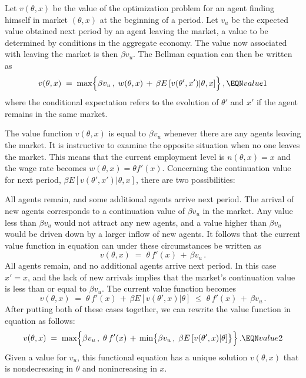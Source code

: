 Let $v(\theta, x)$ be the value of the optimization problem
for an agent finding himself in market $(\theta, x)$ at the
beginning of a period. Let $v_u$ be the expected value obtained
next period by an agent leaving the market, a value to be
determined by conditions in the aggregate economy.
The value now associated with leaving the
market is then $\beta v_u$.
 The Bellman equation can then be
written as %
$$v(\theta, x) \;=\; \max \Bigl\{\beta v_u \,,\; w(\theta, x) \,+\,
   \beta E\left[v(\theta',x') \vert \theta, x \right]
                                                     \Bigr\}\,, \EQN value1
$$
where the conditional expectation refers to the evolution of
$\theta'$ and $x'$ if the agent remains in the same market.


The value function $v(\theta, x)$ is equal to $\beta v_u$ whenever
there are any agents leaving the market. It is instructive to
examine the opposite situation when no one leaves the market.
This means that the current employment level is
$n(\theta, x) = x$ and the wage rate becomes
$w(\theta, x) = \theta f'(x)$. Concerning the continuation
value for next period,
$\beta E\left[v(\theta',x') \vert \theta, x \right]$, there
are two possibilities:

\medskip
{} All agents remain, and some additional agents arrive
next period. The arrival of new agents corresponds to a continuation
value of $\beta v_u$ in the market. Any value less than $\beta v_u$ would not
attract any new agents, and a value higher than $\beta v_u$ would be driven
down by a larger inflow of new agents. It follows that the current
value function in equation  can under these circumstances
be written as
$$v(\theta, x) \;=\; \theta \, f'(x) \,+\, \beta v_u \,.
$$
\medskip
{} All agents remain, and no additional agents arrive
next period. In this case $x' = x$, and the lack of new arrivals
implies that the market's continuation value is less than or equal to
$\beta v_u$. The current value function becomes
$$v(\theta, x) \;=\; \theta \, f'(x) \,+\,
   \beta E\left[v(\theta',x) \vert \theta \right] \;\leq\;
                      \theta \, f'(x) \,+\, \beta v_u \,.
$$
\medskip
After putting both of these cases together, we can rewrite the value
function in equation  as follows:
$$v(\theta, x) \;=\; \max \Bigl\{\beta v_u\,,\; \theta \, f'(x) \,+\,
  \min \bigl\{ \beta v_u\,,\; \beta E\left[v(\theta',x) \vert \theta \right]
      \bigr\} \Bigr\}\,. \EQN value2
$$
Given a value for $v_u$, this functional equation
has a unique solution $v(\theta, x)$ that is
nondecreasing in $\theta$ and nonincreasing in $x$.


